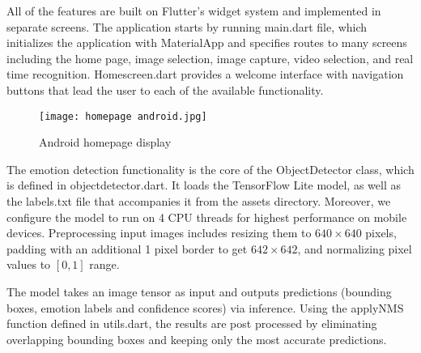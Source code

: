 \documentclass[a4paper,13pt]{report}
\begin{document}
All of the features are built on Flutter's widget system and implemented in separate screens. The application starts by running main.dart file, which initializes the application with MaterialApp and specifies routes to many screens including the home page, image selection, image capture, video selection, and real time recognition. Home\textunderscore screen.dart provides a welcome interface with navigation buttons that lead the user to each of the available functionality.

\begin{figure}[H]
  \centering
  \texttt{[image: homepage android.jpg]}
  \caption{Android homepage display}
  \label{fig:method}
\end{figure}

The emotion detection functionality is the core of the ObjectDetector class, which is defined in object\textunderscore detector.dart. It loads the TensorFlow Lite model, as well as the labels.txt file that accompanies it from the assets directory. Moreover, we configure the model to run on 4 CPU threads for highest performance on mobile devices. Preprocessing input images includes resizing them to $640\times640$ pixels, padding with an additional 1 pixel border to get $642\times642$, and normalizing pixel values to $[0, 1]$ range.

The model takes an image tensor as input and outputs predictions (bounding boxes, emotion labels and confidence scores) via inference. Using the applyNMS function defined in utils.dart, the results are post processed by eliminating overlapping bounding boxes and keeping only the most accurate predictions.
\end{document}

